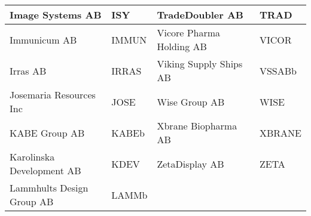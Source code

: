 \documentclass[11pt]{article}
\begin{document}
\begin{table}[H]
{\begin{tabular}{|l|l|l|l|}
\rowcolor[HTML]{EFEFEF} 
Image Systems AB & ISY & TradeDoubler AB & TRAD \\ \hline
Immunicum AB & IMMUN & Vicore Pharma Holding AB & VICOR \\ \hline
\rowcolor[HTML]{EFEFEF} 
Irras AB & IRRAS & Viking Supply Ships AB & VSSABb \\ \hline
Josemaria Resources Inc & JOSE & Wise Group AB & WISE \\ \hline
\rowcolor[HTML]{EFEFEF} 
KABE Group AB & KABEb & Xbrane Biopharma AB & XBRANE \\ \hline
Karolinska Development AB & KDEV & ZetaDisplay AB & ZETA \\ \hline
\rowcolor[HTML]{EFEFEF} 
Lammhults Design Group AB & LAMMb & \multicolumn{2}{l|}{\cellcolor[HTML]{EFEFEF}} \\ \hline
\end{tabular}}
\end{table}





\newpage
\printbibliography
\end{document}
